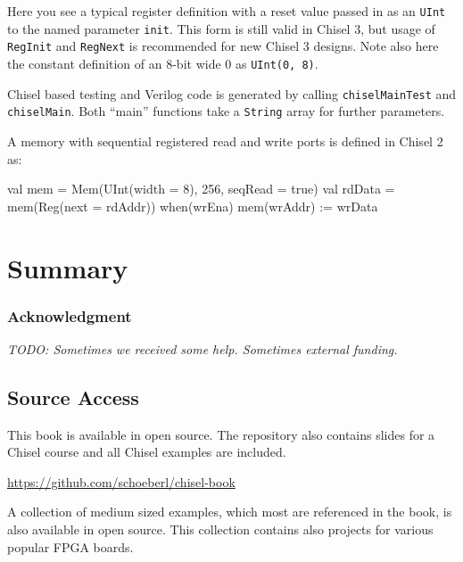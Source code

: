 \documentclass[%
    10pt, %
    headinclude, footexclude,
    openright, %
    notitlepage,
    cleardoubleempty,
    headsepline,
    pointlessnumbers,
    bibtotoc, idxtotoc,
    ]{scrbook}
\newcommand{\code}[1]{{\small{\texttt{#1}}}}
\newcommand{\todo}[1]{{\emph{TODO: #1}}}
\begin{document}
Here you see a typical register definition with a reset value passed in as
an \code{UInt} to the named parameter \code{init}. This form is still valid in Chisel 3,
but usage of \code{RegInit} and \code{RegNext} is recommended for new Chisel 3 designs.
Note also here the constant definition of an 8-bit wide 0 as \code{UInt(0, 8)}.

Chisel based testing and Verilog code is generated by calling \code{chiselMainTest}
and \code{chiselMain}. Both ``main'' functions take a \code{String} array for further parameters.





A memory with sequential registered read and write ports is defined in Chisel 2 as:

\begin{chisel}
  val mem = Mem(UInt(width = 8), 256, seqRead = true)
  val rdData = mem(Reg(next = rdAddr))
  when(wrEna) {
    mem(wrAddr) := wrData
  }
\end{chisel}





\chapter{Summary}
\label{sec:conclusion}

\subsection*{Acknowledgment}

\todo{Sometimes we received some help. Sometimes external funding.}



\section*{Source Access}

This book is available in open source.
The repository also contains slides for a Chisel course and
all Chisel examples are included.

\url{https://github.com/schoeberl/chisel-book}



A collection of medium sized examples, which most are referenced
in the book, is also available in open source. This collection
contains also projects for various popular FPGA boards.
\end{document}
